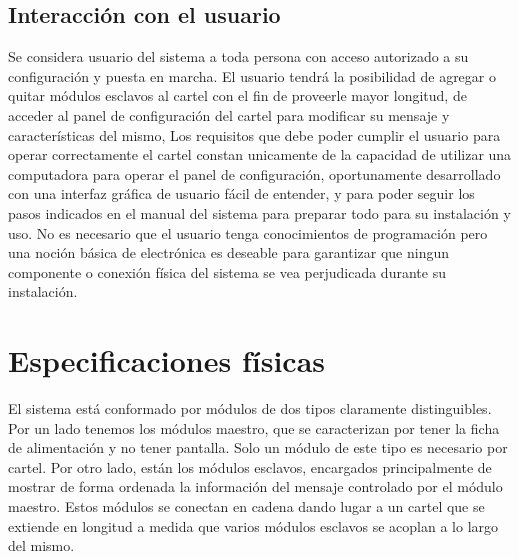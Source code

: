 \subsection{Interacción con el usuario}
	
	Se considera usuario del sistema a toda persona con acceso autorizado a su configuración y puesta en marcha. El usuario tendrá la posibilidad de agregar o quitar módulos esclavos al cartel con el fin de proveerle mayor longitud, de acceder al panel de configuración del cartel para modificar su mensaje y características del mismo, Los requisitos que debe poder cumplir el usuario para operar correctamente el cartel constan unicamente de la capacidad de utilizar una computadora para operar el panel de configuración, oportunamente desarrollado con una interfaz gráfica de usuario fácil de entender, y para poder seguir los pasos indicados en el manual del sistema para preparar todo para su instalación y uso. No es necesario que el usuario tenga conocimientos de programación pero una noción básica de electrónica es deseable para garantizar que ningun componente o conexión física del sistema se vea perjudicada durante su instalación.
	
\section{Especificaciones físicas}

	El sistema está conformado por módulos de dos tipos claramente distinguibles. Por un lado tenemos los módulos maestro, que se caracterizan por tener la ficha de alimentación y no tener pantalla. Solo un módulo de este tipo es necesario por cartel. Por otro lado, están los módulos esclavos, encargados principalmente de mostrar de forma ordenada la información del mensaje controlado por el módulo maestro. Estos módulos se conectan en cadena dando lugar a un cartel que se extiende en longitud a medida que varios módulos esclavos se acoplan a lo largo del mismo. 
	
